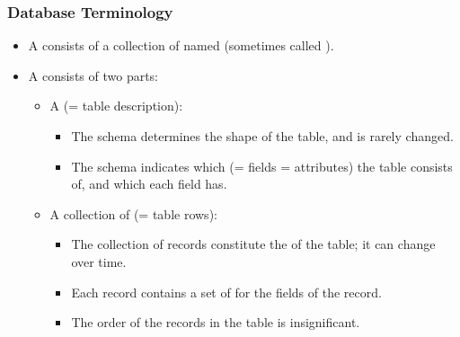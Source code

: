 \documentclass[dvipsnames,handout]{beamer}
\begin{document}
\begin{frame}
\frametitle{Database Terminology}
  
\begin{itemize}
\item A  consists of a collection of named
   (sometimes called ).

\item A  consists of two parts:

  \begin{itemize}
  \item A  (= table description):
  
    \begin{itemize}
    \item The schema determines the shape of the table, and is rarely
      changed.

    \item The schema indicates which  (= fields =
      attributes) the table consists of, and which  each
      field has.
    \end{itemize}
  \item A collection of  (= table rows):
  
    \begin{itemize}
    \item The collection of records constitute the  of
      the table; it can change over time.
  
    \item Each record contains a set of  for the fields of
      the record.

    \item The order of the records in the table is insignificant.
    \end{itemize}
  \end{itemize}
\end{itemize}
\end{frame}
\end{document}
